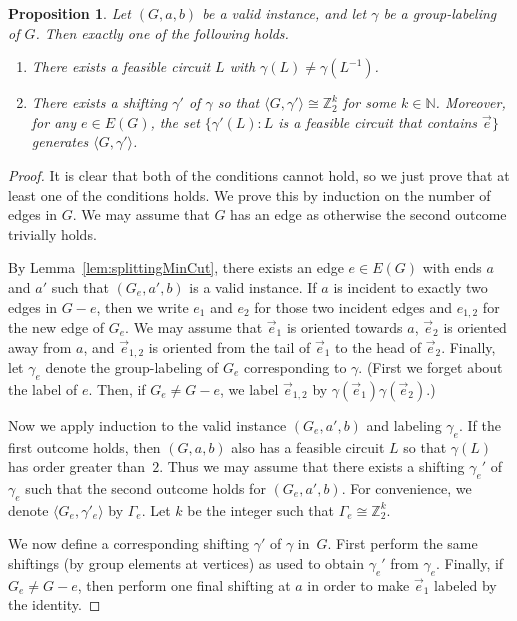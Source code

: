 \documentclass[10pt,a4paper]{amsart}
\newtheorem{proposition}{Proposition}
\begin{document}
\begin{proposition}
\label{prop:3edgeConn}
Let $(G, a,b)$ be a valid instance, and let $\gamma$ be a group-labeling of $G$. Then exactly one of the following holds.\begin{enumerate}
    \item There exists a feasible circuit $L$ with $\gamma(L)\neq \gamma(L^{-1})$.
    \item There exists a shifting $\gamma'$ of $\gamma$ so that $\langle G, \gamma'\rangle\cong \mathbb{Z}_2^k$ for some $k\in \mathbb{N}$. Moreover, for any $e\in E(G)$, the set $\{\gamma'(L): L$ is a feasible circuit that contains $\vec{e}\}$ generates $\langle G, \gamma'\rangle$.
\end{enumerate}
\end{proposition}

\begin{proof}
    It is clear that both of the conditions cannot hold, so we just prove that at least one of the conditions holds. We prove this by induction on the number of edges in $G$. We may assume that $G$ has an edge as otherwise the second outcome trivially holds.

    By Lemma~\ref{lem:splittingMinCut}, there exists an edge $e \in E(G)$ with ends $a$ and $a'$ such that $(G_e, a', b)$ is a valid instance. If $a$ is incident to exactly two edges in $G-e$, then we write $e_1$ and $e_2$ for those two incident edges and $e_{1,2}$ for the new edge of $G_e$. We may assume that $\vec{e}_1$ is oriented towards $a$, $\vec{e}_2$ is oriented away from $a$, and $\vec{e}_{1,2}$ is oriented from the tail of $\vec{e}_1$ to the head of $\vec{e}_2$. Finally, let $\gamma_e$ denote the group-labeling of $G_e$ corresponding to $\gamma$. (First we forget about the label of $e$. Then, if $G_e \neq G-e$, we label $\vec{e}_{1,2}$ by $\gamma(\vec{e}_1)\gamma(\vec{e}_2)$.) 

    Now we apply induction to the valid instance $(G_e, a', b)$ and labeling $\gamma_e$. If the first outcome holds, then $(G, a,b)$ also has a feasible circuit $L$ so that $\gamma(L)$ has order greater than~$2$. Thus we may assume that there exists a shifting $\gamma_e'$ of $\gamma_e$ such that the second outcome holds for $(G_e, a', b)$. For convenience, we denote $\langle G_e, \gamma'_e\rangle$ by $\Gamma_e$. Let $k$ be the integer such that $\Gamma_e \cong \mathbb{Z}_2^k$. 
    
    We now define a corresponding shifting $\gamma'$ of $\gamma$ in~$G$. First perform the same shiftings (by group elements at vertices) as used to obtain $\gamma_e'$ from $\gamma_e$. Finally, if $G_e\neq G-e$, then perform one final shifting at $a$ in order to make $\vec{e}_1$ labeled by the identity.
    

\end{proof}
\end{document}
